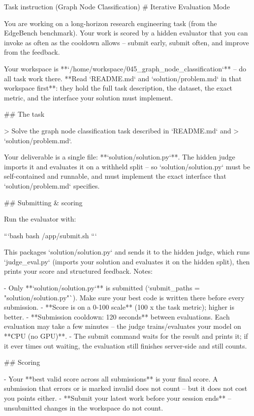 \documentclass[numbers,10pt]{arxiv}
\begin{document}
\begin{promptbox}{Task instruction (Graph Node Classification)}
# Iterative Evaluation Mode

You are working on a long-horizon research engineering task (from the EdgeBench
benchmark). Your work is scored by a hidden evaluator that you can invoke as
often as the cooldown allows -- submit early, submit often, and improve from the
feedback.

Your workspace is **`/home/workspace/045_graph_node_classification`** -- do all
task work there. **Read `README.md` and `solution/problem.md` in that workspace
first**: they hold the full task description, the dataset, the exact metric, and
the interface your solution must implement.

## The task

> Solve the graph node classification task described in `README.md` and
> `solution/problem.md`.

Your deliverable is a single file: **`solution/solution.py`**. The hidden judge
imports it and evaluates it on a withheld split -- so `solution/solution.py` must
be self-contained and runnable, and must implement the exact interface that
`solution/problem.md` specifies.

## Submitting & scoring

Run the evaluator with:

```bash
bash /app/submit.sh
```

This packages `solution/solution.py` and sends it to the hidden judge, which runs
`judge_eval.py` (imports your solution and evaluates it on the hidden split), then
prints your score and structured feedback. Notes:

- Only **`solution/solution.py`** is submitted (`submit_paths = "solution/solution.py"`).
  Make sure your best code is written there before every submission.
- **Score is on a 0-100 scale** (100 x the task metric); higher is better.
- **Submission cooldown: 120 seconds** between evaluations. Each evaluation may
  take a few minutes -- the judge trains/evaluates your model on **CPU (no GPU)**.
- The submit command waits for the result and prints it; if it ever times out
  waiting, the evaluation still finishes server-side and still counts.

## Scoring

- Your **best valid score across all submissions** is your final score. A
  submission that errors or is marked invalid does not count -- but it does not
  cost you points either.
- **Submit your latest work before your session ends** -- unsubmitted changes in
  the workspace do not count.


\end{promptbox}
\end{document}
